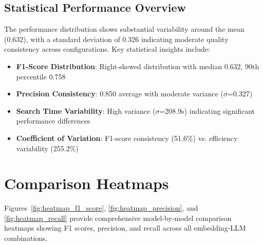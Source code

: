\subsection{Statistical Performance Overview}


The performance distribution shows substantial variability around the mean (0.632), with a standard deviation of 0.326 indicating moderate quality consistency across configurations. Key statistical insights include:

\begin{itemize}
    \item \textbf{F1-Score Distribution}: Right-skewed distribution with median 0.632, 90th percentile 0.758
    \item \textbf{Precision Consistency}: 0.850 average with moderate variance ($\sigma$=0.327)
    \item \textbf{Search Time Variability}: High variance ($\sigma$=208.9s) indicating significant performance differences
    \item \textbf{Coefficient of Variation}: F1-score consistency (51.6\%) vs. efficiency variability (255.2\%)
\end{itemize}

\section{Comparison Heatmaps}
Figures~\ref{fig:heatmap_f1_score}, \ref{fig:heatmap_precision}, and \ref{fig:heatmap_recall} provide comprehensive model-by-model comparison heatmaps showing F1 scores, precision, and recall across all embedding-LLM combinations.

